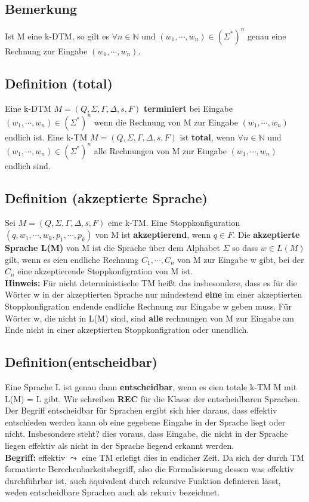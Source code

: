 \subsection{Bemerkung} Ist M eine k-DTM, so gilt es $\forall n \in \mathbb{N}$ und $(w_1, \cdots, w_n) \in (\Sigma^*)^n$ genau eine Rechnung zur Eingabe $(w_1, \cdots, w_n)$.

\subsection{Definition (total)} Eine k-DTM $M = (Q, \Sigma, \Gamma, \Delta, s, F)$ \textbf{terminiert} bei Eingabe $(w_1, \cdots, w_n) \in (\Sigma^*)^n$ wenn die Rechnung von M zur Eingabe $(w_1, \cdots, w_n)$ endlich ist. Eine k-TM $M = (Q, \Sigma, \Gamma, \Delta, s, F)$ ist \textbf{total}, wenn $\forall n \in \mathbb{N}$ und $(w_1, \cdots, w_n) \in (\Sigma^*)^n$ alle Rechnungen von M zur Eingabe $(w_1, \cdots, w_n)$ endlich sind.

\subsection{Definition (akzeptierte Sprache)} Sei $M = (Q, \Sigma, \Gamma, \Delta, s, F)$ eine k-TM. Eine Stoppkonfiguration $(q, w_1, \cdots, w_k, p_1, \cdots, p_k)$ von M ist \textbf{akzeptierend}, wenn $q \in F$. Die \textbf{akzeptierte Sprache L(M)} von M ist die Sprache über dem Alphabet $\Sigma$ so dass $w\in L(M)$ gilt, wenn es eien endliche Rechnung $C_1, \cdots, C_n$ von M zur Eingabe w gibt, bei der $C_n$ eine akzeptierende Stoppkonfigration von M ist. \\ \textbf{Hinweis: } Für nicht deterministische TM heißt das insbesondere, dass es für die Wörter w in der akzeptierten Sprache nur mindestend \textbf{eine} im einer akzeptierten Stoppkonfigration endende endliche Rechnung zur Eingabe w geben muss. Für Wörter w, die nicht in L(M) sind, sind \textbf{alle} rechnungen von M zur Eingabe am Ende nicht in einer akzeptierten Stoppkonfigration oder unendlich.

\subsection{Definition(entscheidbar)}
Eine Sprache L ist genau dann \textbf{entscheidbar}, wenn es eien totale k-TM M mit L(M) = L gibt. Wir schreiben \textbf{REC} für die Klasse der entscheidbaren Sprachen. Der Begriff entscheidbar für Sprachen ergibt sich hier daraus, dass effektiv entschieden werden kann ob eine gegebene Eingabe in der Sprache liegt oder nicht. Insbesondere steht? dies voraus, dass Eingabe, die nicht in der Sprache liegen effektiv als nicht in der Sprache liegend erkannt werden. \\ \textbf{Begriff: } effektiv $\leadsto$ eine TM erlefigt dies in endicher Zeit. Da sich der durch TM formatierte Berechenbarkeitsbegriff, also die Formalisierung dessen was effektiv durchführbar ist, auch äquivalent durch rekursive Funktion definieren lässt, weden entscheidbare Sprachen auch als rekuriv bezeichnet.

